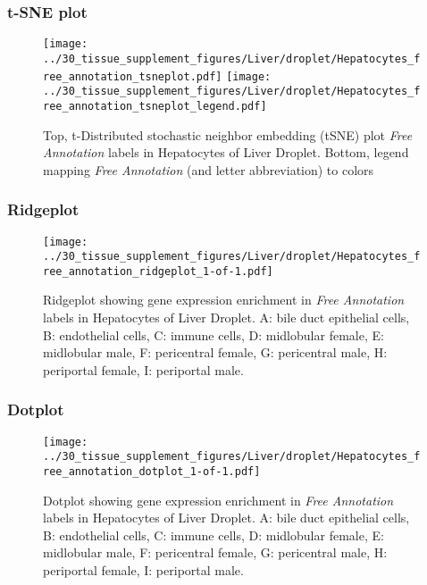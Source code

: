 \clearpage
\subsubsection{t-SNE plot}
\begin{figure}[h]
\centering
\texttt{[image: ../30\_tissue\_supplement\_figures/Liver/droplet/Hepatocytes\_free\_annotation\_tsneplot.pdf]}
\texttt{[image: ../30\_tissue\_supplement\_figures/Liver/droplet/Hepatocytes\_free\_annotation\_tsneplot\_legend.pdf]}
\caption{Top, t-Distributed stochastic neighbor embedding (tSNE) plot  \emph{Free Annotation} labels in Hepatocytes of Liver Droplet. Bottom, legend mapping \emph{Free Annotation} (and letter abbreviation) to colors}
\end{figure}


\clearpage

\subsubsection{Ridgeplot}
\begin{figure}[h]
\centering
\texttt{[image: ../30\_tissue\_supplement\_figures/Liver/droplet/Hepatocytes\_free\_annotation\_ridgeplot\_1-of-1.pdf]}

\caption{ Ridgeplot  showing gene expression enrichment in \emph{Free Annotation} labels in Hepatocytes of Liver Droplet. A: bile duct epithelial cells, B: endothelial cells, C: immune cells, D: midlobular female, E: midlobular male, F: pericentral female, G: pericentral male, H: periportal female, I: periportal male.}
\end{figure}


\clearpage

\subsubsection{Dotplot}
\begin{figure}[h]
\centering
\texttt{[image: ../30\_tissue\_supplement\_figures/Liver/droplet/Hepatocytes\_free\_annotation\_dotplot\_1-of-1.pdf]}

\caption{ Dotplot  showing gene expression enrichment in \emph{Free Annotation} labels in Hepatocytes of Liver Droplet. A: bile duct epithelial cells, B: endothelial cells, C: immune cells, D: midlobular female, E: midlobular male, F: pericentral female, G: pericentral male, H: periportal female, I: periportal male.}
\end{figure}


